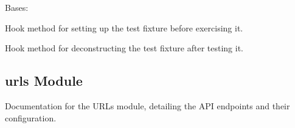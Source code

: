 \documentclass[letterpaper,10pt,english]{sphinxmanual}
\begin{document}

\begin{fulllineitems}
\label{\detokenize{source/api:api.tests.VoiceUploadTestCase}}
\pysigstartsignatures
{}
\pysigstopsignatures
\sphinxAtStartPar
Bases: 

\begin{fulllineitems}
\label{\detokenize{source/api:api.tests.VoiceUploadTestCase.setUp}}
\pysigstartsignatures
{}
\pysigstopsignatures
\sphinxAtStartPar
Hook method for setting up the test fixture before exercising it.

\end{fulllineitems}


\begin{fulllineitems}
\label{\detokenize{source/api:api.tests.VoiceUploadTestCase.tearDown}}
\pysigstartsignatures
{}
\pysigstopsignatures
\sphinxAtStartPar
Hook method for deconstructing the test fixture after testing it.

\end{fulllineitems}


\end{fulllineitems}



\subsection{urls Module}
\label{\detokenize{source/api:urls-module}}
\sphinxAtStartPar
Documentation for the URLs module, detailing the API endpoints and their configuration.
\end{document}
